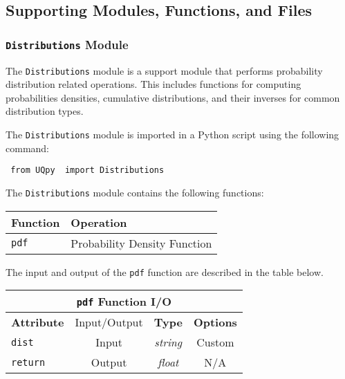 \documentclass[./UsersGuide.tex]{subfiles}
\begin{document}
\subsection{Supporting Modules, Functions, and Files}

\subsubsection{\texttt{Distributions} Module}
\label{Sec:Distributions}

The \texttt{Distributions} module is a support module that performs probability distribution related operations.  This includes functions for computing probabilities densities, cumulative distributions, and their inverses for common distribution types. 

The \texttt{Distributions} module is imported in a Python script using the following command:

\vspace{4mm}
\texttt{{\color{blue} from} \texttt{UQpy} {\color{blue} import} Distributions}
\vspace{4mm}

The \texttt{Distributions} module contains the following functions:

\vspace{4mm}
\begin{center}
	\begin{tabular}{ |l|l| } 
		\hline
		\textbf{Function} &  \textbf{Operation} \\
		\hline
		\texttt{pdf}& Probability Density Function  \\ 
		\hline
	\end{tabular}
\end{center}
\vspace{4mm}

The input and output of the \texttt{pdf} function are described in the table below.

\begin{center}
	\begin{tabular}{ |l|c|c|c| } 
				\hline
		\multicolumn{4}{|c|}{\texttt{pdf} Function I/O} \\
		\hline
		\textbf{Attribute}  & Input/Output & \textbf{Type} & \textbf{Options} \\
		\hline
		\texttt{dist} & Input & {\it string} & Custom \\ 
		\hline
		\texttt{return} & Output & {\it float} & N/A \\ 
		\hline
	\end{tabular}%
\end{center}
\end{document}
